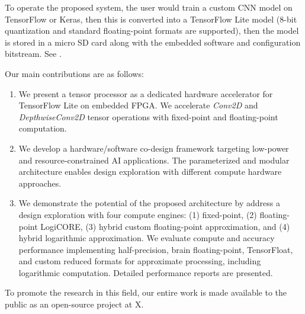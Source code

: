 To operate the proposed system, the user would train a custom CNN model on TensorFlow or Keras, then this is converted into a TensorFlow Lite model (8-bit quantization and standard floating-point formats are supported), then the model is stored in a micro SD card along with the embedded software and configuration bitstream. See .

Our main contributions are as follows:
\begin{enumerate}
	\item We present a tensor processor as a dedicated hardware accelerator for TensorFlow Lite on embedded FPGA. We accelerate \emph{Conv2D} and \emph{DepthwiseConv2D} tensor operations with fixed-point and floating-point computation.
	\item We develop a hardware/software co-design framework targeting low-power and resource-constrained AI applications. The parameterized and modular architecture enables design exploration with different compute hardware approaches.
	\item We demonstrate the potential of the proposed architecture by address a design exploration with four compute engines: (1) fixed-point, (2) floating-point LogiCORE, (3) hybrid custom floating-point approximation, and (4) hybrid logarithmic approximation. We evaluate compute and accuracy performance implementing half-precision, brain floating-point, TensorFloat, and custom reduced formats for approximate processing, including logarithmic computation. Detailed performance reports are presented.
\end{enumerate}

To promote the research in this field, our entire work is made available to the public as an open-source project at X.